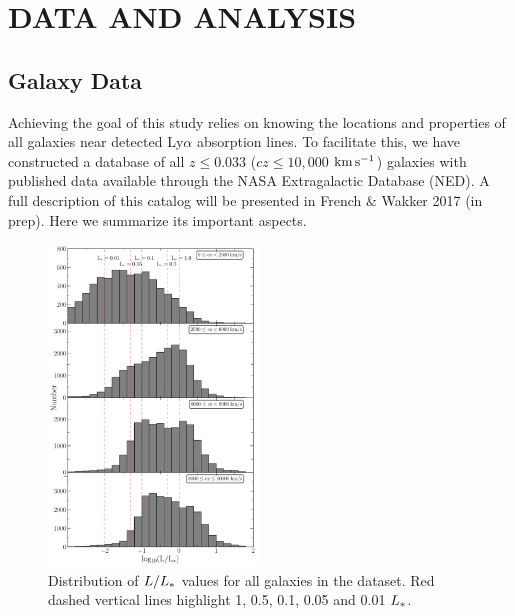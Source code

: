 \documentclass[twocolumn,tighten]{aastex6}
\providecommand{\DIFdelbegin}{} %
\providecommand{\DIFaddbeginFL}{} %
\providecommand{\DIFaddendFL}{} %
\providecommand{\DIFdelbeginFL}{} %
\providecommand{\DIFdelendFL}{} %
\begin{document}
\section{DATA AND ANALYSIS}

\subsection{Galaxy Data}
Achieving the goal of this study relies on knowing the locations and properties of all galaxies near detected Ly$\alpha$ absorption lines. To facilitate this, we have constructed a database of all $z\leq 0.033$ ($cz\leq 10,000$ $\rm km\, s^{-1}$) galaxies with published data available through the NASA Extragalactic Database (NED). A full description of this catalog will be presented in French $\&$ Wakker 2017 (in prep). Here we summarize its important aspects. 

\DIFdelbegin %
\DIFdelendFL \DIFaddbeginFL \begin{figure}[b!]
        \DIFaddendFL \centering
        \vspace{0pt}
        \includegraphics[width=0.50\textwidth]{fig1.pdf}
        \caption{\DIFdelbeginFL %
\DIFdelendFL \DIFaddbeginFL \small{Distribution of $L/L_{\**}$ values for all galaxies in the dataset. Red dashed vertical lines highlight 1, 0.5, 0.1, 0.05 and 0.01 $L_{\**}$.}\DIFaddendFL }
        \label{completeness}
\end{figure} 
\end{document}
